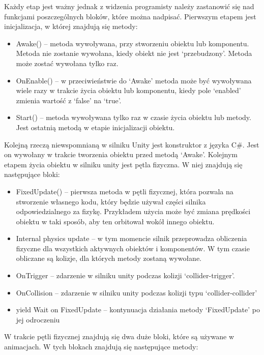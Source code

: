 \documentclass[12pt,twoside]{article}
\begin{document}
Każdy etap jest ważny jednak z widzenia programisty należy zastanowić się nad
funkcjami poszczególnych bloków, które można nadpisać. Pierwszym etapem jest
inicjalizacja, w której znajdują się metody:
\begin{itemize}
\item Awake() – metoda wywoływana, przy stworzeniu obiektu lub komponentu.
Metoda nie zostanie wywołana, kiedy obiekt nie jest ‘przebudzony’. Metoda może
zostać wywołana tylko raz.
\item OnEnable() – w przeciwieństwie do ‘Awake’ metoda może być wywoływana wiele
razy w trakcie życia obiektu lub komponentu, kiedy pole ‘enabled’ zmienia
wartość z ‘false’ na ‘true’.
\item Start() – metoda wywoływana tylko raz w czasie życia obiektu lub metody.
Jest ostatnią metodą w etapie inicjalizacji obiektu. 
\end{itemize}
Kolejną rzeczą niewspomnianą w silniku Unity jest konstruktor z języka C\#. Jest
on wywołany w trakcie tworzenia obiektu przed metodą ‘Awake’. Kolejnym etapem
życia obiektu w silniku unity jest pętla fizyczna. W niej znajdują się
następujące bloki: 
\begin{itemize}
\item FixedUpdate() – pierwsza metoda w pętli fizycznej, która pozwala na
stworzenie własnego kodu, który będzie używał części silnika odpowiedzialnego za
fizykę. Przykładem użycia może być zmiana prędkości obiektu w taki sposób, aby
ten orbitował wokół innego obiektu. 
\item Internal physics update – w tym momencie silnik przeprowadza obliczenia
fizyczne dla wszystkich aktywnych obiektów i komponentów. W tym czasie obliczane
są kolizje, dla których metody zostaną wywołane. 
\item OnTrigger – zdarzenie w silniku unity podczas kolizji ‘collider-trigger’. 
\item OnCollision – zdarzenie w silniku unity podczas kolizji typu
‘collider-collider’
\item yield Wait on FixedUpdate – kontynuacja działania metody ‘FixedUpdate’ po
jej odroczeniu
\end{itemize}
W trakcie pętli fizycznej znajdują się dwa duże bloki, które są używane w
animacjach. W tych blokach znajdują się następujące metody:
\end{document}
